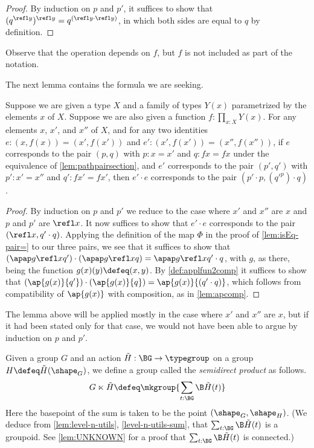 \begin{proof}
  By induction on $p$ and $p'$, it suffices to show that $ ( q ^{ \refl y }) ^ { \refl y } = q ^{( \refl y \cdot \refl y )}$, in which both sides are
  equal to $q$ by definition.
\end{proof}

Observe that the operation depends on $f$, but $f$ is not included as part of the notation.

The next lemma contains the formula we are seeking.

\begin{lemma}\label{lem:pathpairsectionmult}
  Suppose we are given a type $X$ and a family of types $Y(x)$ parametrized by the elements $x$ of $X$.
  Suppose we are also given a function $f : \prod_{x:X} Y(x)$.
  For any elements $x$, $x'$, and $x''$ of $X$, and for any two identities $e : (x,f(x)) = (x',f(x'))$ and $e' : (x',f(x')) = (x'',f(x''))$,
  if $e$ corresponds to the pair $(p,q)$ with $p : x = x'$ and $q : f x = f x$ under the equivalence of \cref{lem:pathpairsection},
  and $e'$ corresponds to the pair $(p',q')$ with $p' : x' = x''$ and $q' : f x' = f x'$,
  then $e' \cdot e$ corresponds to the pair $(p' \cdot p , ({q'} ^ p) \cdot q)$.
\end{lemma}

\begin{proof}
  By induction on $p$ and $p'$ we reduce to the case where $x'$ and $x''$ are $x$ and $p$ and $p'$ are $\refl x$.
  It now suffices to show that $e' \cdot e$ corresponds to the pair $(\refl x , q' \cdot q)$.
  Applying the definition of the map $\Phi$ in the proof of \cref{lem:isEq-pair=} to our three pairs, we see that it suffices to show that
  $\left( \apap g {\refl x} {q'} \right) \cdot \left( \apap g {\refl x} {q} \right) = \apap g {\refl x} {q' \cdot q}$, with $g$, as there, being the function $ g(x)(y) \defeq (x,y)$.
  By \cref{def:applfun2comp} it suffices to show that $\left( \ap {g(x)} {q'} \right) \cdot \left( \ap {g(x)} {q} \right) = \ap {g(x)} {(q' \cdot q)}$, which follows from
  compatibility of $\ap {g(x)}$ with composition, as in \cref{lem:apcomp}.
\end{proof}

The lemma above will be applied mostly in the case where $x'$ and $x''$ are $x$, but if it had been stated only for that case, we would not have
been able to argue by induction on $p$ and $p'$.

\begin{definition}\label{def:semidirect-product}
  Given a group $G$ and an action $\tilde H : \BG \to \typegroup$ on a group $H \defeq \tilde H(\shape_G)$, we define a group called the {\em
    semidirect product} as follows.
  $$G \ltimes \tilde H \defeq \mkgroup { \sum_{t:\BG} \B \tilde H(t) }$$
  Here the basepoint of the sum is taken to be the point $(\shape_G,\shape_H)$.
  (We deduce from \cref{lem:level-n-utils}, \cref{level-n-utils-sum}, that $\sum_{t:\BG} \B \tilde H(t)$ is a groupoid.
  See \cref{lem:UNKNOWN} for a proof that $\sum_{t:\BG} \B \tilde H(t)$ is connected.)
\end{definition}

